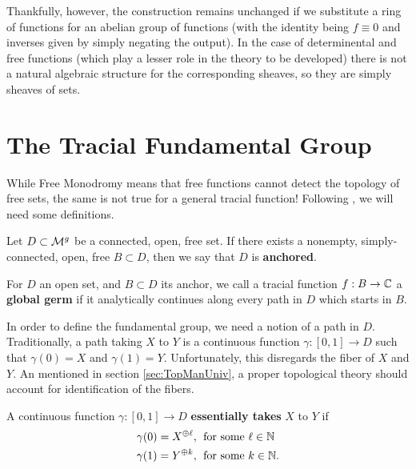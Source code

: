 Thankfully, however, the construction remains unchanged if we substitute a ring
of functions for an abelian group of functions (with the identity being
\(f \equiv 0\) and inverses given by simply negating the output). In the case of
determinental and free functions (which play a lesser role in the theory to be
developed) there is not a natural algebraic structure for the corresponding
sheaves, so they are simply sheaves of sets.

\section{The Tracial Fundamental Group}%
\label{sec:trpi1}

While Free Monodromy means that free functions cannot detect the topology of
free sets, the same is not true for a general tracial
function! Following \cite{pascoeFreeNoncommutativePrincipal2020}, we will need
some definitions.

\begin{definition}[Anchored]%
  \label{def:anchored}
Let \(D \subset \mathcal{M}^{g} \) be a connected, open, free set. If there exists a
nonempty, simply-connected, open, free \(B \subset D\), then we say that \(D\)
is \textbf{anchored}.
\end{definition}

\begin{definition}
  \label{def:globgerm}
  For \(D\) an open set, and \(B \subset D\) its anchor, we call a tracial
  function \(f:B\to \mathbb{C} \) a \textbf{global germ} if it analytically continues
  along every path in \(D\) which starts in \(B\).
\end{definition}

In order to define the fundamental group, we need a notion of a path in \(D\).
Traditionally, a path taking \(X\) to \(Y\) is a continuous function
\(\gamma: [0,1]\to D\) such that \(\gamma(0)=X\) and \(\gamma(1)=Y\).
Unfortunately, this disregards the fiber of \(X\) and \(Y\). An mentioned in
section \ref{sec:TopManUniv}, a proper topological theory should account for
identification of the fibers.

\begin{definition}
  \label{def:esspath}
  A continuous function \(\gamma:[0,1]\to D\) \textbf{essentially takes} \(X\) to \(Y\) if
  \begin{align*}
    \gamma(0) = X^{\oplus \ell},& \;\text{ for some \(\ell \in \mathbb{N}\)}\\
    \gamma(1) = Y^{\oplus k},& \;\text{ for some \(k \in \mathbb{N}\)}.
  \end{align*}
\end{definition}

